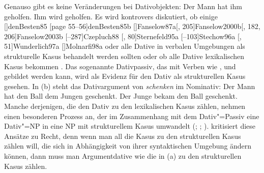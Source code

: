 Genauso gibt es keine Veränderungen bei Dativobjekten:
\eal
\ex Der Mann hat ihm geholfen.
\ex Ihm wird geholfen.
\zl
Es wird kontrovers diskutiert, ob einige 
\parencites
{Wegener85a}%
{Wegener90}%
[]{denBesten85}%
[page 55--56]{denBesten85b}%
[]{Fanselow87a}[, 205]{Fanselow2000b}[, 182, 206]{Fanselow2003b}%
[--287]{Czepluch88}%
[, 80]{Sternefeld95a}%
[--103]{Stechow96a}%
[, 51]{Wunderlich97a}%
[]{Molnarfi98a} %
oder alle \parencites[]{Sternefeld95a}%
[, 205--206]{Ryu97a}%
[--97]{Gunkel2003b} Dative in verbalen Umgebungen als
strukturelle Kasus behandelt werden sollten 
oder ob alle Dative lexikalischen Kasus bekommen \parencites[]{Haider85b}%
[]{Haider86}[, 217, 228]{HM94a}%
{Mueller99a,Mueller2001a}[]{Mueller2003e}%
[]{Scherpenisse86a}%
[, 291]{Pollard94a}%
[]{Meurers99b}[]{VS98a}[]{Abraham95a-u}%
[]{McIntyre2006a}%
{Woolford2006a}.
%
%
Das sogenannte Dativpassiv, das mit Verben wie
,  und  gebildet werden kann,
wird als Evidenz für den Dativ als strukturellen Kasus gesehen.
In (b) steht das Dativargument von \emph{schenken} im Nominativ:
\eal
\ex Der Mann  hat   den Ball dem Jungen geschenkt.
\ex Der Junge bekam den Ball            geschenkt.
\zl
Manche derjenigen, die den Dativ zu den lexikalischen Kasus zählen, nehmen
einen besonderen Prozess an, der im Zusammenhang mit dem Dativ"=Passiv
eine Dativ"=NP in eine NP mit strukturellem Kasus umwandelt 
(\citealp[Abschnitt~4.1]{Haider86}; \citealp[]{HM94a}; \citealp[]{Mueller99a}).
\citet{Gunkel2003b} kritisiert diese Ansätze zu Recht, denn wenn man all die
Kasus zu den strukturellen Kasus zählen will, die sich in Abhängigkeit von
ihrer syntaktischen Umgebung ändern können, dann muss man Argumentdative wie die
in (a) zu den strukturellen Kasus zählen.


